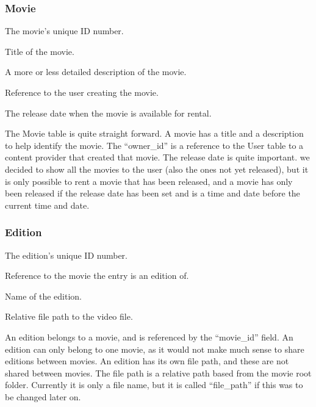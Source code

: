 \subsubsection{Movie}
\label{Design_Database_Tables_Movie}

\begin{my_description}
\item[movie\_id] The movie's unique ID number.
\item[title] Title of the movie.
\item[description] A more or less detailed description of the movie.
\item[owner\_id] Reference to the user creating the movie.
\item[release\_date] The release date when the movie is available for rental.
\end{my_description}

The Movie table is quite straight forward. A movie has a title and a description to help identify the movie. The ``owner\_id'' is a reference to the User table to a content provider that created that movie. The release date is quite important. we decided to show all the movies to the user (also the ones not yet released), but it is only possible to rent a movie that has been released, and a movie has only been released if the release date has been set and is a time and date before the current time and date.

\subsubsection{Edition}
\label{Design_Database_Tables_Edition}

\begin{my_description}
\item[edition\_id] The edition's unique ID number.
\item[movie\_id] Reference to the movie the entry is an edition of.
\item[name] Name of the edition.
\item[file\_path] Relative file path to the video file.
\end{my_description}

An edition belongs to a movie, and is referenced by the ``movie\_id'' field. An edition can only belong to one movie, as it would not make much sense to share editions between movies. An edition has its own file path, and these are not shared between movies. The file path is a relative path based from the movie root folder. Currently it is only a file name, but it is called ``file\_path'' if this was to be changed later on.

